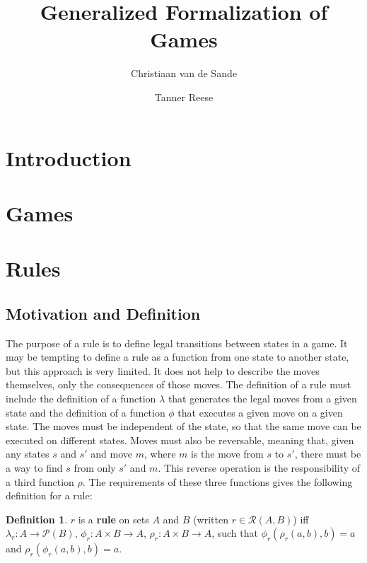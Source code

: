 \documentclass{article}
\title{Generalized Formalization of Games}
\author{Christiaan van de Sande \and Tanner Reese}
\theoremstyle{definition}
\newtheorem{definition}{Definition}[subsection]
\theoremstyle{plain}
\def\rule{\mathcal{R}}
\begin{document}
\maketitle


\section{Introduction}
 
\section{Games}

\section{Rules}

\subsection{Motivation and Definition}

The purpose of a rule is to define legal transitions between states in a game.
It may be tempting to define a rule as a function from one state to another state, but this approach is very limited.
It does not help to describe the moves themselves, only the consequences of those moves.
The definition of a rule must include
the definition of a function $ \lambda $ that generates the legal moves from a given state
and the definition of a function $ \phi $ that executes a given move on a given state.
The moves must be independent of the state, so that the same move can be executed on different states.
Moves must also be reversable,
meaning that, given any states $ s $ and $ s' $ and move $ m $,
where $ m $ is the move from $ s $ to $ s' $,
there must be a way to find $ s $ from only $ s' $ and $ m $.
This reverse operation is the responsibility of a third function $ \rho $.
The requirements of these three functions gives the following definition for a rule:

 \begin{definition}
  $ r $ is a \textbf{rule} on sets $ A $ and $ B $ (written  $ r \in \rule (A, B) $) iff
  $ \lambda_r : A          \rightarrow \mathcal{P} (B) $,
  $    \phi_r : A \times B \rightarrow A $,
  $    \rho_r : A \times B \rightarrow A $,
  such that $ \phi_r (\rho_r (a, b), b) = a $
  and $ \rho_r (\phi_r (a, b), b) = a $.
\end{definition}
\end{document}
